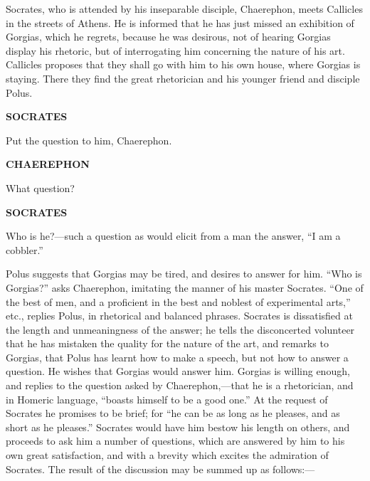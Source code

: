 \documentclass[11pt,letter]{article}
\begin{document}
\par  Socrates, who is attended by his inseparable disciple, Chaerephon, meets Callicles in the streets of Athens. He is informed that he has just missed an exhibition of Gorgias, which he regrets, because he was desirous, not of hearing Gorgias display his rhetoric, but of interrogating him concerning the nature of his art. Callicles proposes that they shall go with him to his own house, where Gorgias is staying. There they find the great rhetorician and his younger friend and disciple Polus.

\par \textbf{SOCRATES}
\par   Put the question to him, Chaerephon.

\par \textbf{CHAEREPHON}
\par   What question?

\par \textbf{SOCRATES}
\par   Who is he?—such a question as would elicit from a man the answer, “I am a cobbler.”

\par  Polus suggests that Gorgias may be tired, and desires to answer for him. “Who is Gorgias?” asks Chaerephon, imitating the manner of his master Socrates. “One of the best of men, and a proficient in the best and noblest of experimental arts,” etc., replies Polus, in rhetorical and balanced phrases. Socrates is dissatisfied at the length and unmeaningness of the answer; he tells the disconcerted volunteer that he has mistaken the quality for the nature of the art, and remarks to Gorgias, that Polus has learnt how to make a speech, but not how to answer a question. He wishes that Gorgias would answer him. Gorgias is willing enough, and replies to the question asked by Chaerephon,—that he is a rhetorician, and in Homeric language, “boasts himself to be a good one.” At the request of Socrates he promises to be brief; for “he can be as long as he pleases, and as short as he pleases.” Socrates would have him bestow his length on others, and proceeds to ask him a number of questions, which are answered by him to his own great satisfaction, and with a brevity which excites the admiration of Socrates. The result of the discussion may be summed up as follows:—
\end{document}
